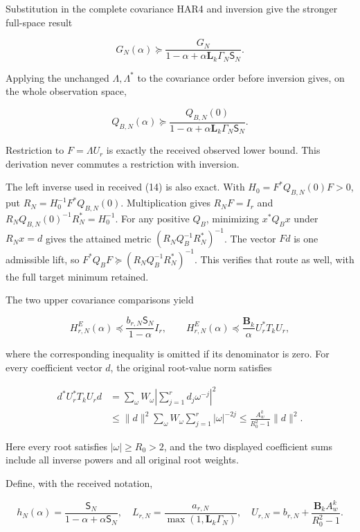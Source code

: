 \documentclass[11pt]{article}
\begin{document}
Substitution in the complete covariance HAR4 and inversion give the stronger full-space result

\[
\boxed{
G_N(\alpha)\succeq
\frac{G_N}{1-\alpha+\alpha\mathbf L_k\Gamma_N\mathsf S_N}.
}
\tag{HAR22}
\]

Applying the unchanged \(\Lambda,\Lambda^*\) to the covariance order before inversion gives, on the whole observation space,

\[
Q_{B,N}(\alpha)\succeq
\frac{Q_{B,N}(0)}{1-\alpha+\alpha\mathbf L_k\Gamma_N\mathsf S_N}.
\tag{HAR23}
\]

Restriction to \(F=\Lambda U_r\) is exactly the received observed lower bound. This derivation never commutes a restriction with inversion.

The left inverse used in received (14) is also exact. With \(H_0=F^*Q_{B,N}(0)F>0\), put \(R_N=H_0^{-1}F^*Q_{B,N}(0)\). Multiplication gives \(R_NF=I_r\) and \(R_NQ_{B,N}(0)^{-1}R_N^*=H_0^{-1}\). For any positive \(Q_B\), minimizing \(x^*Q_Bx\) under \(R_Nx=d\) gives the attained metric \((R_NQ_B^{-1}R_N^*)^{-1}\). The vector \(Fd\) is one admissible lift, so \(F^*Q_BF\succeq(R_NQ_B^{-1}R_N^*)^{-1}\). This verifies that route as well, with the full target minimum retained.

The two upper covariance comparisons yield

\[
H^E_{r,N}(\alpha)\preceq
\frac{b_{r,N}\mathsf S_N}{1-\alpha}I_r,
\qquad
H^E_{r,N}(\alpha)\preceq
\frac{\mathbf B_k}{\alpha}U_r^*T_kU_r,
\tag{HAR24}
\]

where the corresponding inequality is omitted if its denominator is zero. For every coefficient vector \(d\), the original root-value norm satisfies

\[
\begin{aligned}
d^*U_r^*T_kU_rd
&=\sum_\omega W_\omega\left|\sum_{j=1}^rd_j\omega^{-j}\right|^2\\
&\le\|d\|^2\sum_\omega W_\omega\sum_{j=1}^r|\omega|^{-2j}
\le\frac{A_w^k}{R_0^2-1}\|d\|^2.
\end{aligned}
\tag{HAR25}
\]

Here every root satisfies \(|\omega|\ge R_0>2\), and the two displayed coefficient sums include all inverse powers and all original root weights.

Define, with the received notation,

\[
h_N(\alpha)=\frac{\mathsf S_N}{1-\alpha+\alpha\mathsf S_N},
\quad L_{r,N}=\frac{a_{r,N}}{\max(1,\mathbf L_k\Gamma_N)},
\quad U_{r,N}=b_{r,N}+\frac{\mathbf B_kA_w^k}{R_0^2-1}.
\tag{HAR26}
\]
\end{document}
